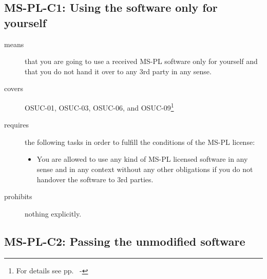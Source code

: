 \begin{center}
\begin{footnotesize}
{{{{{        }


      }
 
    }
   }   
}
\end{footnotesize}
\end{center}

\subsection{MS-PL-C1: Using the software only for yourself}
\label{OSUC-01-MS-PL} 
\label{OSUC-03-MS-PL} 
\label{OSUC-06-MS-PL}
\label{OSUC-09-MS-PL}
  
\begin{description}
  \item[means] that you are going to use a received MS-PL software only for
  yourself and that you do not hand it over to any 3rd party in any sense.
  \item[covers] OSUC-01, OSUC-03, OSUC-06, and OSUC-09\footnote{For details see
  pp.\ \pageref{OSUC-01-DEF} - \pageref{OSUC-09-DEF}}
  \item[requires] the following tasks in order to fulfill the conditions of the MS-PL
  license:
  \begin{itemize}
    \item You are allowed to use any kind of MS-PL licensed software in any
    sense and in any context without any other obligations if you do not
    handover the software to 3rd parties.
  \end{itemize}
\item[prohibits] nothing explicitly.
\end{description}


\subsection{MS-PL-C2: Passing the unmodified software}
\label{OSUC-02S-MS-PL} \label{OSUC-05S-MS-PL} \label{OSUC-07S-MS-PL} 
\label{OSUC-02B-MS-PL} \label{OSUC-05B-MS-PL} \label{OSUC-07B-MS-PL} 

